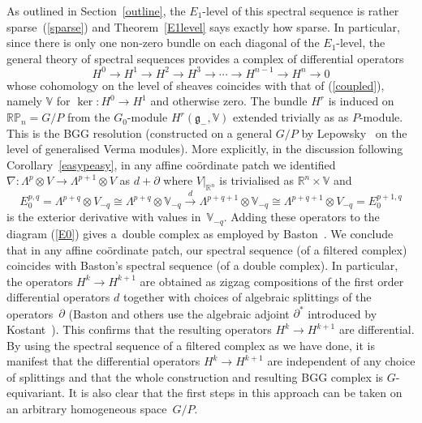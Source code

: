 \documentclass[pdftex]{sigma}
\begin{document}
As outlined in Section~\ref{outline}, the $E_1$-level of this spectral sequence is
rather sparse~(\ref{sparse}) and Theorem~\ref{E1level} says exactly how sparse.
In particular, since there is only one non-zero bundle on each diagonal of the
$E_1$-level, the general theory of spectral sequences provides a complex of
dif\/ferential operators
\[H^0\to H^1\to H^2\to H^3\to\cdots\to H^{n-1}\to H^n\to 0\]
whose cohomology on the level of sheaves coincides with that of
(\ref{coupled}), namely ${\mathbb{V}}$ for $\ker:H^0\to H^1$ and otherwise
zero. The bundle $H^r$ is induced on ${\mathbb{RP}}_n=G/P$ from the
$G_0$-module $H^r({\mathfrak{g}}_-,{\mathbb{V}})$ extended trivially as as
$P$-module. This is the BGG resolution (constructed on a general $G/P$ by
Lepowsky~\cite{l} on the level of generalised Verma modules). More explicitly,
in the discussion following Corollary~\ref{easypeasy}, in any af\/f\/ine
co\"ordinate patch we identif\/ied
$\nabla:\Lambda^p\otimes V\to\Lambda^{p+1}\otimes V$ as $d+\partial$ where
$V|_{{\mathbb{R}}^n}$ is trivialised as ${\mathbb{R}}^n\times{\mathbb{V}}$ and
\[E_0^{p,q}=\Lambda^{p+q}\otimes V_{-q}\cong
\Lambda^{p+q}\otimes{\mathbb{V}}_{-q}\stackrel{d}{\longrightarrow}
\Lambda^{p+q+1}\otimes{\mathbb{V}}_{-q}\cong\Lambda^{p+q+1}\otimes V_{-q}=
E_0^{p+1,q}\]
is the exterior derivative with values in~${\mathbb{V}}_{-q}$. Adding these
operators to the diagram (\ref{E0}) gives a~double complex as employed by
Baston~\cite[p.~120]{b}. We conclude that in any af\/f\/ine co\"ordinate patch, our
spectral sequence (of a f\/iltered complex) coincides with Baston's spectral
sequence (of a double complex). In particular, the operators $H^k\to H^{k+1}$
are obtained as zigzag compositions of the f\/irst order dif\/ferential operators
$d$ together with choices of algebraic splittings of the operators~$\partial$
(Baston and others use the algebraic adjoint $\partial^*$ introduced by
Kostant~\cite{k}). This conf\/irms that the resulting operators $H^k\to H^{k+1}$
are dif\/ferential. By using the spectral sequence of a f\/iltered complex as we
have done, it is manifest that the dif\/ferential operators $H^k\to H^{k+1}$ are
independent of any choice of splittings and that the whole construction and
resulting BGG complex is $G$-equivariant. It is also clear that the f\/irst steps
in this approach can be taken on an arbitrary homogeneous space~$G/P$.
\end{document}
